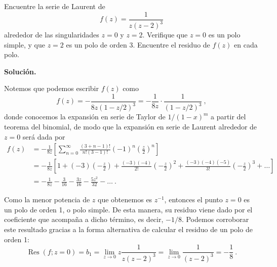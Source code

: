 \begin{ejemplo}
    Encuentre la serie de Laurent de
    \begin{equation*}
        f(z) = \frac{1}{z(z-2)^3} 
    \end{equation*}
    alrededor de las singularidades $z=0$ y $z=2$. Verifique que $z=0$ es un polo simple, y que $z=2$ es un polo de orden 3. Encuentre el residuo de $f(z)$ en cada polo.   

    \noindent \textbf{Solución.} 

    Notemos que podemos escribir $f(z)$ como 
    \begin{equation*}
        f(z) = -\frac{1}{8z(1 - z/2)^3} = - \frac{1}{8z} \cdot \frac{1}{(1-z/2)^3} \ ,
    \end{equation*}
    donde conocemos la expansión en serie de Taylor de $1/(1-x)^m$ a partir del teorema del binomial, de modo que la expansión en serie de Laurent alrededor de $z=0$ será dada por
    \begin{align*}
        f(z) & = -\frac{1}{8z} \left[ \sum_{n=0}^\infty \frac{(3+n-1)!}{n!(3-1)!} (-1)^n \left( \frac{z}{2} \right)^n \right] \\
        & = -\frac{1}{8z} \left[ 1 + (-3) \left(-\frac{z}{2}\right) + \frac{(-3)(-4)}{2!}\left( - \frac{z}{2} \right)^2 + \frac{(-3)(-4)(-5)}{3!}\left(-\frac{z}{2}\right)^3 + \dots \right] \\
        & = - \frac{1}{8z} - \frac{3}{16} - \frac{3z}{16} - \frac{5z^2}{32} - \dots \ .
    \end{align*}

    Como la menor potencia de $z$ que obtenemos es $z^{-1}$, entonces el punto $z=0$ es un polo de orden 1, o polo simple. De esta manera, su residuo viene dado por el coeficiente que acompaña a dicho término, es decir, $-1/8$. Podemos corroborar este resultado gracias a la forma alternativa de calcular el residuo de un polo de orden 1:
    \begin{equation*}
        \operatorname{Res}(f; z=0) = b_1 = \lim_{z \to 0}z\frac{1}{z(z-2)^3} = \lim_{z \to 0} \frac{1}{(z-2)^3} = - \frac{1}{8} \ .
    \end{equation*}


\end{ejemplo}
